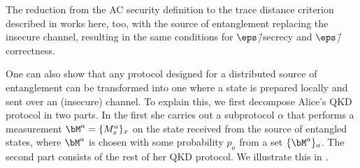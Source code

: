 The reduction from the AC security definition to the trace distance criterion described in  works here, too, with the source of entanglement replacing the insecure channel, resulting in the same conditions for $\eps$\=/secrecy and $\eps$\=/correctness.

One can also show that any protocol designed for a distributed source
of entanglement can be transformed into one where a state is prepared
locally and sent over an (insecure) channel. To explain this, we first
decompose Alice's QKD protocol in two parts.  In the first she carries
out a subprotocol $\alpha$ that performs a measurement
$\bM^a = \{M^a_x\}_x$ on the state received from the source of
entangled states, where $\bM^a$ is chosen with some probability $p_a$
from a set $\{\bM^a\}_a$. The second part consists of the rest of her
QKD protocol. We illustrate this in .

